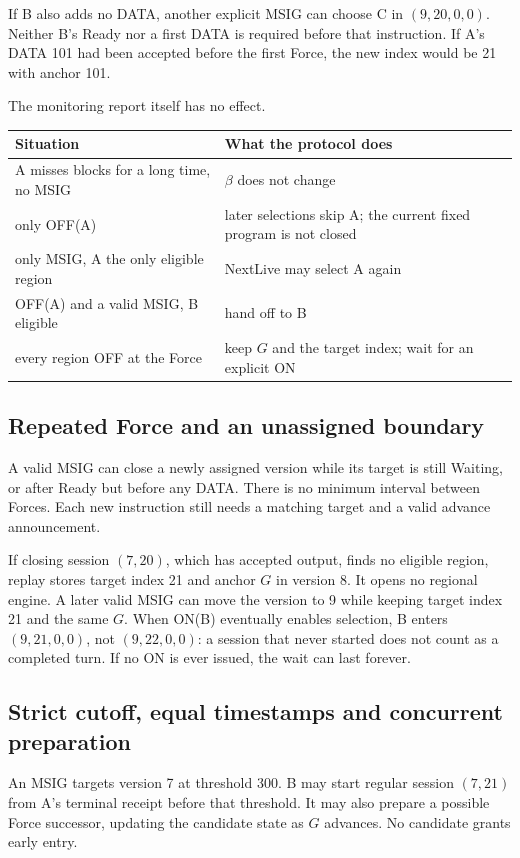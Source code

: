 \documentclass[11pt,a4paper]{article}
\newcounter{protocol}
\begin{document}
If B also adds no DATA, another explicit MSIG can choose C in
$(9,20,0,0)$. Neither B's Ready nor a first DATA is required before that
instruction. If A's DATA 101 had been accepted before the first Force,
the new index would be 21 with anchor 101.

The monitoring report itself has no effect.
\begin{center}\small
\begin{tabularx}{\linewidth}{@{}>{\raggedright\arraybackslash}p{.45\linewidth}Y@{}}\toprule
Situation & What the protocol does\\\midrule
A misses blocks for a long time, no MSIG & $\beta$ does not change\\
only OFF(A) & later selections skip A; the current fixed program is not closed\\
only MSIG, A the only eligible region & NextLive may select A again\\
OFF(A) and a valid MSIG, B eligible & hand off to B\\
every region OFF at the Force & keep $G$ and the target index; wait for an explicit ON\\\bottomrule
\end{tabularx}
\end{center}

\subsection{Repeated Force and an unassigned boundary}
\label{sec:repeated-force}
A valid MSIG can close a newly assigned version while its target is
still Waiting, or after Ready but before any DATA. There is no minimum
interval between Forces. Each new instruction still needs a matching
target and a valid advance announcement.

If closing session $(7,20)$, which has accepted output, finds no eligible
region, replay stores target index 21 and anchor $G$ in version 8. It
opens no regional engine. A later valid MSIG can move the version to 9
while keeping target index 21 and the same $G$. When ON(B) eventually
enables selection, B enters $(9,21,0,0)$, not $(9,22,0,0)$: a session
that never started does not count as a completed turn. If no ON is ever
issued, the wait can last forever.

\subsection{Strict cutoff, equal timestamps and concurrent preparation}
\label{sec:cutoff-example}
An MSIG targets version 7 at threshold 300. B may start regular session
$(7,21)$ from A's terminal receipt before that threshold. It may also
prepare a possible Force successor, updating the candidate state as $G$
advances. No candidate grants early entry.
\end{document}
